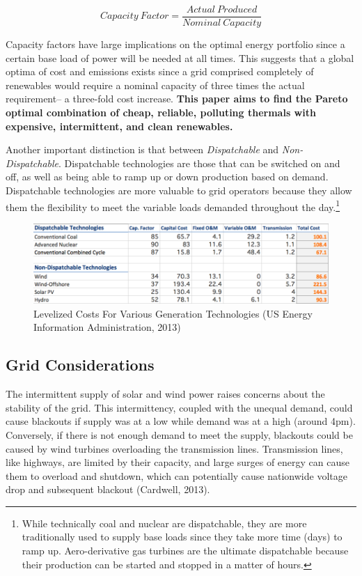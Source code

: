 \documentclass{article}
\begin{document}
\begin{equation}
Capacity \: Factor = \frac{Actual \: Produced}{Nominal \: Capacity}
\end{equation}

Capacity factors have large implications on the optimal energy portfolio since a certain base load of power will be needed at all times. This suggests that a global optima of cost and emissions exists since a grid comprised completely of renewables would require a nominal capacity of three times the actual requirement-- a three-fold cost increase. {\bf This paper aims to find the Pareto optimal combination of cheap, reliable, polluting thermals with expensive, intermittent, and clean renewables. }\*

Another important distinction is that between \emph{Dispatchable} and \emph{Non-Dispatchable}. Dispatchable technologies are those that can be switched on and off, as well as being able to ramp up or down production based on demand. Dispatchable technologies are more valuable to grid operators because they allow them the flexibility to meet the variable loads demanded throughout the day.\footnote{While technically coal and nuclear are dispatchable, they are more traditionally used to supply base loads since they take more time (days) to ramp up. Aero-derivative gas turbines are the ultimate dispatchable because their production can be started and stopped in a matter of hours.}

\begin{figure}[H]
	\begin{center}
	\includegraphics[scale = .5]{Figures/costssource.png}
	\caption{Levelized Costs For Various Generation Technologies (US Energy Information Administration, 2013)}
	\end{center}
\end{figure}


\subsection{Grid Considerations}
The intermittent supply of solar and wind power raises concerns about the stability of the grid. This intermittency, coupled with the unequal demand, could cause blackouts if supply was at a low while demand was at a high (around 4pm). Conversely, if there is not enough demand to meet the supply, blackouts could be caused by wind turbines overloading the transmission lines. Transmission lines, like highways, are limited by their capacity, and large surges of energy can cause them to overload and shutdown, which can potentially cause nationwide voltage drop and subsequent blackout (Cardwell, 2013).   
\end{document}
